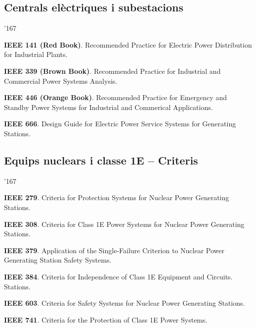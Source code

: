 \subsection*{Centrals el\`{e}ctriques i subestacions}
\begin{dinglist}{'167}
    \item \textbf{IEEE 141 (Red Book)}. Recommended Practice for Electric Power Distribution for Industrial Plants.
    \item \textbf{IEEE 339 (Brown Book)}. Recommended Practice for Industrial and Commercial Power Systems Analysis.
    \item \textbf{IEEE 446 (Orange Book)}. Recommended Practice for Emergency and Standby Power Systems for Industrial and Commerical Applications.
    \item \textbf{IEEE 666}. Design Guide for Electric Power Service Systems for Generating Stations.
\end{dinglist}


\subsection*{Equips nuclears i classe 1E -- Criteris} 
\begin{dinglist}{'167}
    \item \textbf{IEEE 279}. Criteria for Protection Systems for Nuclear Power Generating Stations.
    \item \textbf{IEEE 308}. Criteria for Class 1E Power Systems for Nuclear Power Generating Stations.
    \item \textbf{IEEE 379}. Application of the Single-Failure Criterion to Nuclear Power Generating Station Safety Systems.
    \item \textbf{IEEE 384}. Criteria for Independence of Class 1E Equipment and Circuits.
        Stations.
    \item \textbf{IEEE 603}. Criteria for Safety Systems for Nuclear Power Generating Stations.
    \item \textbf{IEEE 741}. Criteria for the Protection of Class 1E Power Systems.
\end{dinglist}



